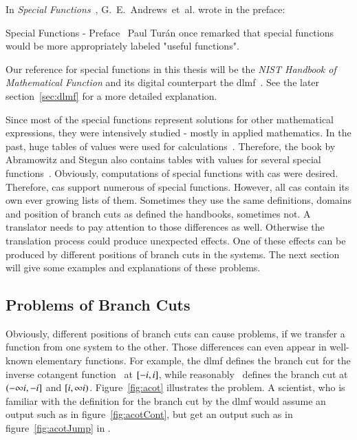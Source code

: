 In \textit{Special Functions}~\cite{SF:Book}, G.~E.~Andrews~et~al. wrote in the preface:
\begin{myQuote}{Special Functions - Preface~\cite{SF:Book}}
Paul Tur\'an once remarked that special functions would be more appropriately labeled "useful functions".
\end{myQuote}

Our reference for special functions in this thesis will be the \textit{NIST Handbook of Mathematical Function} and its digital counterpart the \gls{dlmf}~\cite{NIST:DLMF}. See the later section~\ref{sec:dlmf} for a more detailed explanation. 

Since most of the special functions represent solutions for other mathematical expressions, they were intensively studied - mostly in applied mathematics. In the past, huge tables of values were used for calculations~\cite{Tables}. Therefore, the book by Abramowitz and Stegun also contains tables with values for several special functions~\cite{AbramowitzStegun}. Obviously, computations of special functions with \gls{cas} were desired. Therefore, \gls{cas} support numerous of special functions. However, all \gls{cas} contain its own ever growing lists of them. Sometimes they use the same definitions, domains and position of branch cuts as defined the handbooks, sometimes not. A translator needs to pay attention to those differences as well. Otherwise the translation process could produce unexpected effects. One of these effects can be produced by different positions of branch cuts in the systems. The next section will give some examples and explanations of these problems.

\subsection{Problems of Branch Cuts}\label{subsec:branch-cut-issues}
Obviously, different positions of branch cuts can cause problems, if we transfer a function from one system to the other. Those differences can even appear in well-known elementary functions. For example, the \gls{dlmf} defines the branch cut for the inverse cotangent function~\cite[(4.23.9)]{NIST:DLMF} at $[-{i}, {i}]$, while \Maple{} reasonably~\cite{Branches:acot} defines the branch cut at $(-\infty{i}, -{i}]$ and $[{i}, \infty{i})$. Figure~\ref{fig:acot} illustrates the problem. A scientist, who is familiar with the definition for the branch cut by the \gls{dlmf} would assume an output such as in figure~\ref{fig:acotCont}, but get an output such as in figure~\ref{fig:acotJump} in \Maple.


